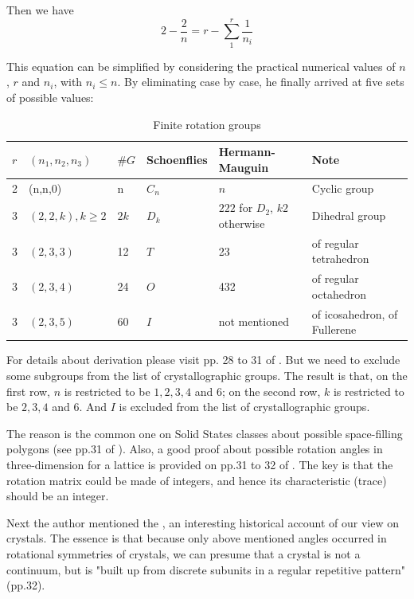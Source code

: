 \documentclass{article}
\begin{document}
    Then we have
    \begin{equation}
        2-\frac{2}{n} = r-\sum_{1}^{r} \frac{1}{n_i}
    \end{equation}

    This equation can be simplified by considering the practical numerical values of
    $n$, $r$ and $n_i$, with $n_i \leq n$. By eliminating case by case, he finally arrived
    at five sets of possible values:
    \begin{table}[H]
    \centering
    \label{tab:Finite-rot-g}
    \caption{Finite rotation groups}
    \begin{tabular}{l l l l l l}
        \hline
        $r$ & $(n_1,n_2,n_3)$ & $\# G$ & Schoenflies & Hermann-Mauguin & Note
        \\
        \hline
        \hline
        2 & (n,n,0) & n & $C_n$ & $n$ & Cyclic group \\
        3 & $(2,2,k), k\geq 2$ & $2k$ & $D_k$ & $222$ for $D_2$, $k2$ otherwise & Dihedral group \\
        3 & $(2,3,3)$ & 12  & $T$  & 23& of regular tetrahedron \\
        3 & $(2,3,4)$ & 24 & $O$ & 432 & of regular octahedron \\
        3 & $(2,3,5)$ & 60 & $I$ & not mentioned & of icosahedron, of
        Fullerene\footnotemark\\
        \hline
    \end{tabular}
    \end{table}
    For details about derivation please visit pp. 28 to 31 of \cite{Sternberg1994}.
    But we need to exclude some subgroups from the list of crystallographic groups.
    The result is that, on the first row, $n$ is restricted to be $1,2,3,4$ and $6$;
    on the second row, $k$ is restricted to be $2,3,4$ and $6$. And $I$ is excluded
    from the list of crystallographic groups. 

    The reason is the common one on Solid States classes about possible space-filling
    polygons (see pp.31 of \cite{Sternberg1994}). Also, a good proof about possible
    rotation angles in three-dimension for a lattice is provided on pp.31 to 32 of
    \cite{Sternberg1994}. The key is that the rotation matrix could be
    made of integers, and hence its characteristic (trace) should be an integer.

    Next the author mentioned the , an interesting
    historical account of our view on crystals. The essence is that because only
    above mentioned angles occurred in rotational symmetries of crystals, we can
    presume that a crystal is not a continuum, but is "built up from discrete
    subunits in a regular repetitive pattern" (pp.32).
\end{document}
